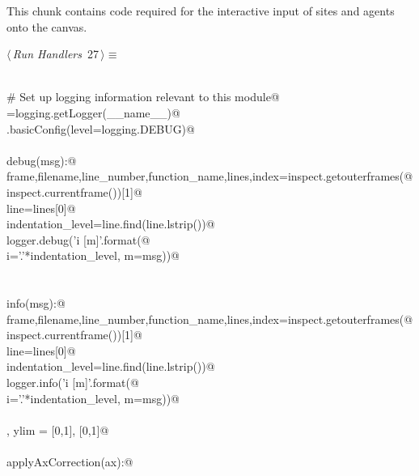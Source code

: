 \documentclass[10pt, english, oneside]{report}
\begin{document}
\begin{appendices}
This chunk contains code required for the interactive input of sites and agents onto the canvas. 

\begin{flushleft} \small\label{scrap25}\raggedright\small
{} $\langle\,${\itshape Run Handlers}\nobreak\ {\footnotesize {27}}$\,\rangle\equiv$
\vspace{-1ex}
\begin{list}{}{} \item
\mbox{}\verb@@\\
\mbox{}\verb@# Set up logging information relevant to this module@\\
\mbox{}\verb@logger=logging.getLogger(__name__)@\\
\mbox{}\verb@logging.basicConfig(level=logging.DEBUG)@\\
\mbox{}\verb@@\\
\mbox{}\verb@def debug(msg):@\\
\mbox{}\verb@    frame,filename,line_number,function_name,lines,index=inspect.getouterframes(@\\
\mbox{}\verb@        inspect.currentframe())[1]@\\
\mbox{}\verb@    line=lines[0]@\\
\mbox{}\verb@    indentation_level=line.find(line.lstrip())@\\
\mbox{}\verb@    logger.debug('{i} [{m}]'.format(@\\
\mbox{}\verb@        i='.'*indentation_level, m=msg))@\\
\mbox{}\verb@@\\
\mbox{}\verb@@\\
\mbox{}\verb@def info(msg):@\\
\mbox{}\verb@    frame,filename,line_number,function_name,lines,index=inspect.getouterframes(@\\
\mbox{}\verb@        inspect.currentframe())[1]@\\
\mbox{}\verb@    line=lines[0]@\\
\mbox{}\verb@    indentation_level=line.find(line.lstrip())@\\
\mbox{}\verb@    logger.info('{i} [{m}]'.format(@\\
\mbox{}\verb@        i='.'*indentation_level, m=msg))@\\
\mbox{}\verb@@\\
\mbox{}\verb@xlim, ylim = [0,1], [0,1]@\\
\mbox{}\verb@@\\
\mbox{}\verb@def applyAxCorrection(ax):@\\

\end{list}
\end{flushleft}
\end{appendices}
\end{document}
